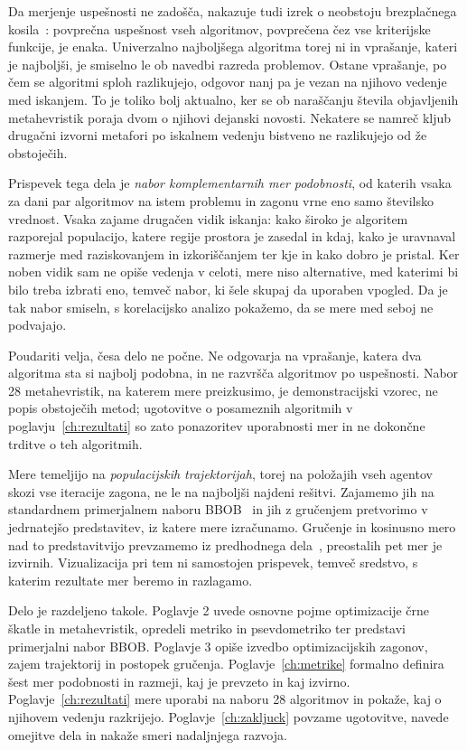 \documentclass[a4paper, 12pt]{book}
\begin{document}
Da merjenje uspešnosti ne zadošča, nakazuje tudi izrek o neobstoju
brezplačnega kosila~\cite{585893}: povprečna uspešnost vseh algoritmov,
povprečena čez vse kriterijske funkcije, je enaka. Univerzalno najboljšega
algoritma torej ni in vprašanje, kateri je najboljši, je smiselno le ob
navedbi razreda problemov. Ostane vprašanje, po čem se algoritmi sploh
razlikujejo, odgovor nanj pa je vezan na njihovo vedenje med iskanjem. To je
toliko bolj aktualno, ker se ob naraščanju števila objavljenih metahevristik
poraja dvom o njihovi dejanski novosti. Nekatere se namreč kljub drugačni izvorni
metafori po iskalnem vedenju bistveno ne razlikujejo od že obstoječih.

Prispevek tega dela je \emph{nabor komplementarnih mer podobnosti}, od
katerih vsaka za dani par algoritmov na istem problemu in zagonu vrne eno
samo številsko vrednost. Vsaka zajame drugačen vidik iskanja: kako široko je
algoritem razporejal populacijo, katere regije prostora je zasedal in kdaj,
kako je uravnaval razmerje med raziskovanjem in izkoriščanjem ter kje in kako
dobro je pristal. Ker noben vidik sam ne opiše vedenja v celoti, mere niso
alternative, med katerimi bi bilo treba izbrati eno, temveč nabor, ki šele
skupaj da uporaben vpogled. Da je tak nabor smiseln, s korelacijsko analizo
pokažemo, da se mere med seboj ne podvajajo.

Poudariti velja, česa delo ne počne. Ne odgovarja na vprašanje, katera dva
algoritma sta si najbolj podobna, in ne razvršča algoritmov po uspešnosti.
Nabor 28 metahevristik, na katerem mere preizkusimo, je demonstracijski
vzorec, ne popis obstoječih metod; ugotovitve o posameznih algoritmih v
poglavju~\ref{ch:rezultati} so zato ponazoritev uporabnosti mer in ne
dokončne trditve o teh algoritmih.

Mere temeljijo na \emph{populacijskih trajektorijah}, torej na položajih vseh
agentov skozi vse iteracije zagona, ne le na najboljši najdeni rešitvi.
Zajamemo jih na standardnem primerjalnem naboru BBOB~\cite{hansen2021coco} in
jih z gručenjem pretvorimo v jedrnatejšo predstavitev, iz katere mere
izračunamo. Gručenje in kosinusno mero nad to predstavitvijo prevzamemo iz
predhodnega dela~\cite{clustopt2025, cenikj2025searchbehavior}, preostalih
pet mer je izvirnih. Vizualizacija pri tem ni samostojen prispevek, temveč
sredstvo, s katerim rezultate mer beremo in razlagamo.

Delo je razdeljeno takole. Poglavje 2 uvede osnovne pojme optimizacije črne
škatle in metahevristik, opredeli metriko in psevdometriko ter predstavi
primerjalni nabor BBOB. Poglavje 3 opiše izvedbo optimizacijskih zagonov,
zajem trajektorij in postopek gručenja. Poglavje~\ref{ch:metrike} formalno
definira šest mer podobnosti in razmeji, kaj je prevzeto in kaj izvirno.
Poglavje~\ref{ch:rezultati} mere uporabi na naboru 28 algoritmov in pokaže,
kaj o njihovem vedenju razkrijejo. Poglavje~\ref{ch:zakljuck} povzame
ugotovitve, navede omejitve dela in nakaže smeri nadaljnjega razvoja.
\end{document}
